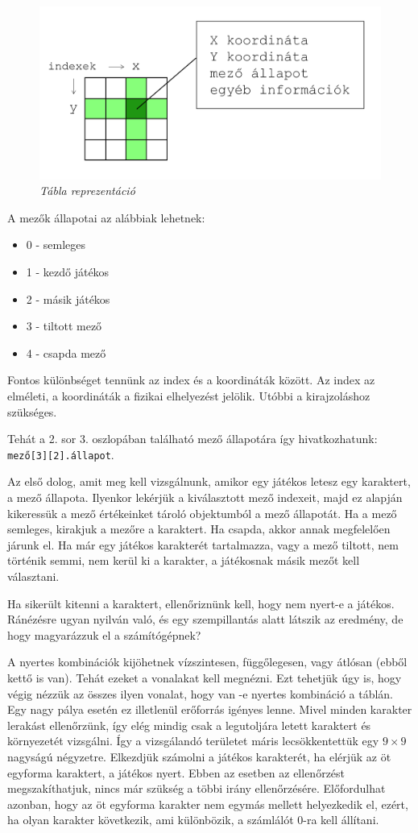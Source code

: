 \begin{figure}[!h]
	\centering
	\includegraphics[width=0.6\linewidth]{kepek/field-representation.png}
	\caption{\textit{Tábla reprezentáció}}
	\label{fig:field-repr}
\end{figure}

A mezők állapotai az alábbiak lehetnek:
\begin{itemize}	
	\item 0 - semleges
	\item 1 - kezdő játékos
	\item 2 - másik játékos
	\item 3 - tiltott mező
	\item 4 - csapda mező
\end{itemize}

Fontos különbséget tennünk az index és a koordináták között. Az index az elméleti, a koordináták a fizikai elhelyezést jelölik. Utóbbi a kirajzoláshoz szükséges.

Tehát a 2. sor 3. oszlopában található mező állapotára így hivatkozhatunk: \\
\texttt{mező[3][2].állapot}.


Az első dolog, amit meg kell vizsgálnunk, amikor egy játékos letesz egy karaktert, a mező állapota. Ilyenkor lekérjük a kiválasztott mező indexeit, majd ez alapján kikeressük a mező értékeinket tároló objektumból a mező állapotát. Ha a mező semleges, kirakjuk a mezőre a karaktert. Ha csapda, akkor annak megfelelően járunk el. Ha már egy játékos karakterét tartalmazza, vagy a mező tiltott, nem történik semmi, nem kerül ki a karakter, a játékosnak másik mezőt kell választani.

Ha sikerült kitenni a karaktert, ellenőriznünk kell, hogy nem nyert-e a játékos. Ránézésre ugyan nyilván való, és egy szempillantás alatt látszik az eredmény, de hogy magyarázzuk el a számítógépnek?

A nyertes kombinációk kijöhetnek vízszintesen, függőlegesen, vagy átlósan (ebből kettő is van). Tehát ezeket a vonalakat kell megnézni. Ezt tehetjük úgy is, hogy végig nézzük az összes ilyen vonalat, hogy van -e nyertes kombináció a táblán. Egy nagy pálya esetén ez illetlenül erőforrás igényes lenne. Mivel minden karakter lerakást ellenőrzünk, így elég mindig csak a legutoljára letett karaktert és környezetét vizsgálni. Így a vizsgálandó területet máris lecsökkentettük egy $9 \times 9$ nagyságú négyzetre. Elkezdjük számolni a játékos karakterét, ha elérjük az öt egyforma karaktert, a játékos nyert. Ebben az esetben az ellenőrzést megszakíthatjuk, nincs már szükség a többi irány ellenőrzésére. Előfordulhat azonban, hogy az öt egyforma karakter nem egymás mellett helyezkedik el, ezért, ha olyan karakter következik, ami különbözik, a számlálót 0-ra kell állítani.

